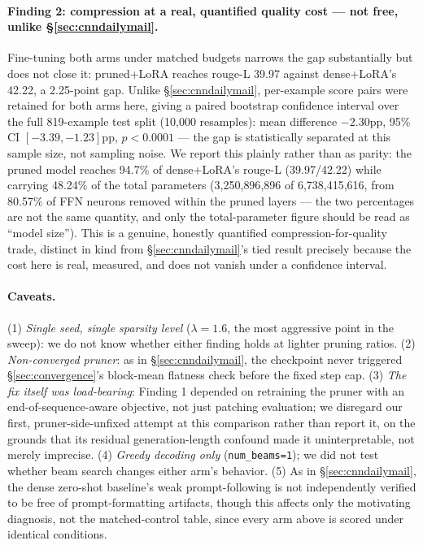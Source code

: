 \documentclass[11pt]{article}
\begin{document}
\paragraph{Finding 2: compression at a real, quantified quality cost --- not free, unlike \S\ref{sec:cnndailymail}.} Fine-tuning both arms under matched budgets
narrows the gap substantially but does not close it: pruned+LoRA reaches
rouge-L 39.97 against dense+LoRA's 42.22, a 2.25-point gap. Unlike
\S\ref{sec:cnndailymail}, per-example score pairs were retained for both
arms here, giving a paired bootstrap confidence interval over the full
819-example test split (10{,}000 resamples): mean difference $-2.30$pp, 95\%
CI $[-3.39,-1.23]$pp, $p<0.0001$ --- the gap is statistically separated at
this sample size, not sampling noise. We report this plainly rather than as
parity: the pruned model reaches 94.7\% of dense+LoRA's rouge-L
(39.97/42.22) while carrying 48.24\% of the total parameters
(3{,}250{,}896{,}896 of 6{,}738{,}415{,}616, from 80.57\% of FFN neurons
removed within the pruned layers --- the two percentages are not the same
quantity, and only the total-parameter figure should be read as ``model
size''). This is a genuine, honestly quantified compression-for-quality
trade, distinct in kind from \S\ref{sec:cnndailymail}'s tied result
precisely because the cost here is real, measured, and does not vanish
under a confidence interval.

\paragraph{Caveats.} (1) \emph{Single seed, single sparsity level}
($\lambda=1.6$, the most aggressive point in the sweep): we do not know
whether either finding holds at lighter pruning ratios. (2)
\emph{Non-converged pruner}: as in \S\ref{sec:cnndailymail}, the checkpoint
never triggered \S\ref{sec:convergence}'s block-mean flatness check before
the fixed step cap. (3) \emph{The fix itself was load-bearing}: Finding 1
depended on retraining the pruner with an end-of-sequence-aware objective,
not just patching evaluation; we disregard our first, pruner-side-unfixed
attempt at this comparison rather than report it, on the grounds that its
residual generation-length confound made it uninterpretable, not merely
imprecise. (4) \emph{Greedy decoding only} (\texttt{num\_beams=1}); we did
not test whether beam search changes either arm's behavior. (5) As in
\S\ref{sec:cnndailymail}, the dense zero-shot baseline's weak prompt-following is not independently verified to be free of prompt-formatting artifacts, though this affects only the motivating diagnosis, not the matched-control table, since every arm above is scored under identical conditions.
\end{document}
